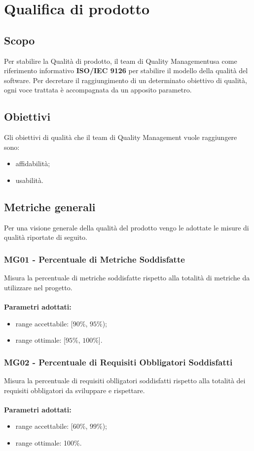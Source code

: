 \section{Qualifica di prodotto}
\subsection{Scopo}
Per stabilire la Qualità di prodotto, il team di Quality Management\glo usa come riferimento informativo \textbf{ISO/IEC 9126} per stabilire il modello della qualità del software. Per decretare il raggiungimento di un determinato obiettivo di qualità, ogni voce trattata è accompagnata da un apposito parametro.
\subsection{Obiettivi}
Gli obiettivi di qualità che il team di Quality Management vuole raggiungere sono:
\begin{itemize}
\item affidabilità;
\item usabilità.
\end{itemize}
\subsection{Metriche generali}
Per una visione generale della qualità del prodotto vengo le adottate le misure di qualità riportate di seguito.
\subsubsection{MG01 - Percentuale di Metriche Soddisfatte}
Misura la percentuale di metriche soddisfatte rispetto alla totalità di metriche da utilizzare nel progetto.\\ \\ 
\textbf{Parametri adottati:} 
\begin{itemize}
\item range accettabile: [$90\%$, $95\%$);
\item range ottimale: [$95\%$, $100\%$].
\end{itemize}
 
\subsubsection{MG02 - Percentuale di Requisiti Obbligatori Soddisfatti}
Misura la percentuale di requisiti oblligatori soddisfatti rispetto alla totalità dei requisiti obbligatori da sviluppare e rispettare.\\ \\ 
\textbf{Parametri adottati:} 
\begin{itemize}
\item range accettabile: [$60\%$, $99\%$);
\item range ottimale: 100\%.
\end{itemize}

